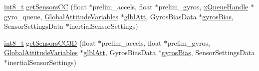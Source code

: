 \begin{DoxyCompactItemize}
\item 
\hyperlink{stdint_8h_ad566f6541e98b74246db1a3a3a85ad49}{int8\-\_\-t} \hyperlink{group___attitude_ga525bb97712e9393c390475f4b14ad6ac}{get\-Sensors\-C\-C} (float $\ast$prelim\-\_\-accels, float $\ast$prelim\-\_\-gyros, \hyperlink{_common_2_libraries_2_free_r_t_o_s_2_source_2include_2queue_8h_a229037f755b756156e34a440ce134b8b}{x\-Queue\-Handle} $\ast$gyro\-\_\-queue, \hyperlink{struct_global_attitude_variables}{Global\-Attitude\-Variables} $\ast$\hyperlink{group___state_ga76682d72011dc0109f1d5cf25a6c6da0}{glbl\-Att}, Gyros\-Bias\-Data $\ast$\hyperlink{group___state_ga233a2d6850e9c466f80ae6bb2ebd98e8}{gyros\-Bias}, Sensor\-Settings\-Data $\ast$inertial\-Sensor\-Settings)
\item 
\hyperlink{stdint_8h_ad566f6541e98b74246db1a3a3a85ad49}{int8\-\_\-t} \hyperlink{group___attitude_gaefea6b47a03faf8d9d5af8093ccbc686}{get\-Sensors\-C\-C3\-D} (float $\ast$prelim\-\_\-accels, float $\ast$prelim\-\_\-gyros, \hyperlink{struct_global_attitude_variables}{Global\-Attitude\-Variables} $\ast$\hyperlink{group___state_ga76682d72011dc0109f1d5cf25a6c6da0}{glbl\-Att}, Gyros\-Bias\-Data $\ast$\hyperlink{group___state_ga233a2d6850e9c466f80ae6bb2ebd98e8}{gyros\-Bias}, Sensor\-Settings\-Data $\ast$inertial\-Sensor\-Settings)
\end{DoxyCompactItemize}

